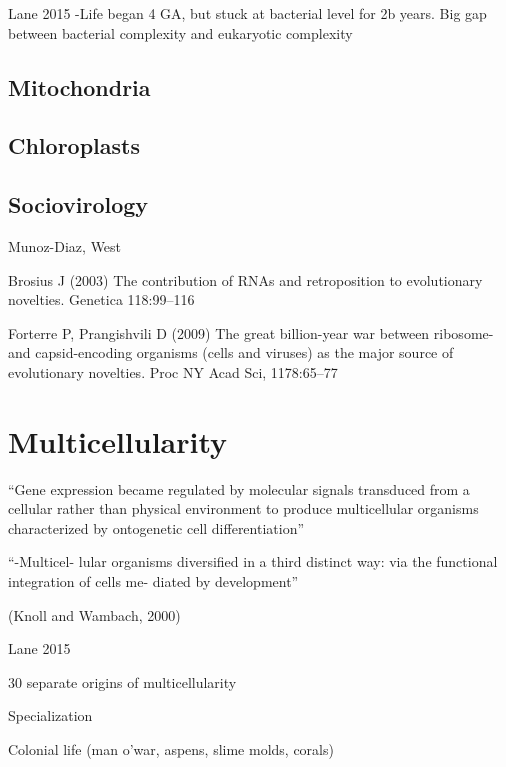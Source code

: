 \documentclass{tufte-book} %
\begin{document}
Lane 2015
-Life began 4 GA, but stuck at bacterial level for 2b years. Big gap between bacterial complexity and eukaryotic complexity


\section{Mitochondria}\label{mitochondria}

\section{Chloroplasts}\label{chloroplast}

\section{Sociovirology}\label{socioviro}

Munoz-Diaz, West


Brosius J (2003) The contribution of RNAs and retroposition to evolutionary novelties. Genetica 118:99–116

Forterre P, Prangishvili D (2009) The great billion-year war between ribosome- and capsid-encoding organisms
(cells and viruses) as the major source of evolutionary novelties. Proc NY Acad Sci, 1178:65–77





\chapter{Multicellularity}\label{ch:multicell}

“Gene expression became regulated by molecular signals transduced from a cellular rather than physical environment to produce multicellular organisms characterized by ontogenetic cell differentiation” 

“-Multicel- lular organisms diversified in a third distinct way: via the functional integration of cells me- diated by development”

(Knoll and Wambach, 2000)

Lane 2015

30 separate origins of multicellularity 

Specialization

Colonial life (man o’war, aspens, slime molds, corals)
\end{document}
